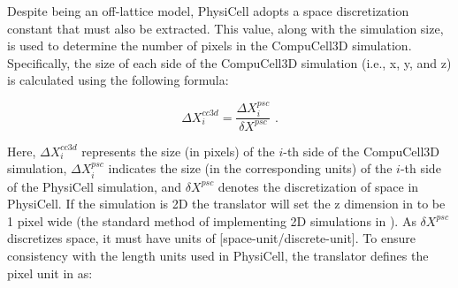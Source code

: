

Despite being an off-lattice model, PhysiCell adopts a space discretization constant that must also be extracted. This value, along with the simulation size, is used to determine the number of pixels in the CompuCell3D simulation. Specifically, the size of each side of the CompuCell3D simulation (i.e., x, y, and z) is calculated using the following formula:

\begin{equation}\label{eq:trans:set-sim-size}
    \Delta X^{cc3d}_i = \frac{\Delta X^{psc}_i}{\delta X^{psc}}\,\,.
\end{equation}



Here, $\Delta X^{cc3d}_i$ represents the size (in pixels) of the $i$-th side of the CompuCell3D simulation, $\Delta X^{psc}_i$ indicates the size (in the corresponding units) of the $i$-th side of the PhysiCell simulation, and $\delta X^{psc}$ denotes the discretization of space in PhysiCell. If the \pscs simulation is 2D the translator will set the z dimension in \ccds to be 1 pixel wide (the standard method of implementing 2D simulations in \ccd). As $\delta X^{psc}$ discretizes space, it must have units of [space-unit/discrete-unit]. To ensure consistency with the length units used in PhysiCell, the translator defines the pixel unit in \ccds as:

